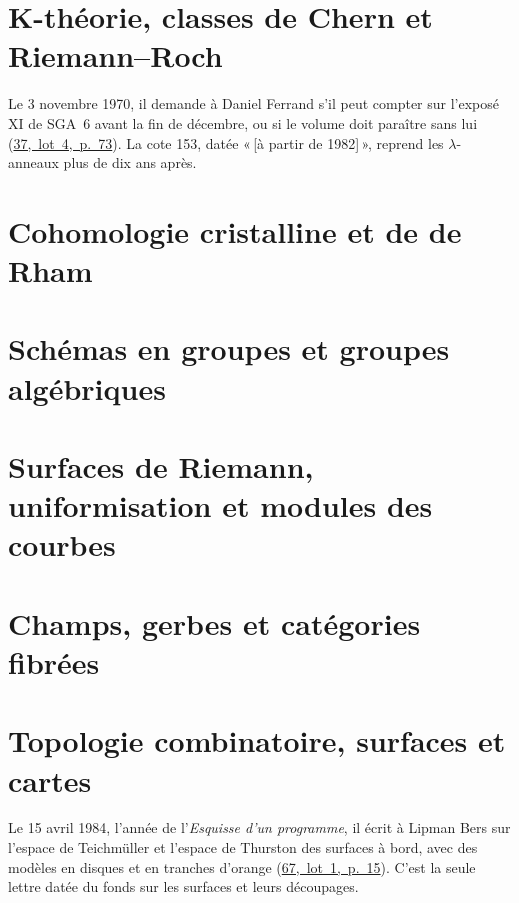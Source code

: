 \documentclass[11pt]{article}
\newcommand{\q}[1]{«\,#1\,»}
\newcommand{\lot}[3]{\mbox{\href{https://grothendieck.commutator.io/\##1/#2/p#3}{#1, lot #2, p.~#3}}}
\newcommand{\lettres}[1]{{\small #1\par}\medskip}
\theoremstyle{plain}
\theoremstyle{definition}
\theoremstyle{plain}
\theoremstyle{definition}
\theoremstyle{remark}
\renewcommand{\_}{\bkunderscore\allowbreak}
\begin{document}
\part{K-théorie, classes de Chern et Riemann--Roch}
\lettres{Le 3 novembre 1970, il demande à Daniel Ferrand s'il peut compter sur l'exposé XI de SGA~6 avant la fin de décembre, ou si le volume doit paraître sans lui (\lot{37}{4}{73}). La cote 153, datée \q{[à partir de 1982]}, reprend les $\lambda$-anneaux plus de dix ans après.}




\part{Cohomologie cristalline et de de Rham}



\part{Schémas en groupes et groupes algébriques}
















\part{Surfaces de Riemann, uniformisation et modules des courbes}



\part{Champs, gerbes et catégories fibrées}



\part{Topologie combinatoire, surfaces et cartes}
\lettres{Le 15 avril 1984, l'année de l'\emph{Esquisse d'un programme}, il écrit à Lipman Bers sur l'espace de Teichmüller et l'espace de Thurston des surfaces à bord, avec des modèles en disques et en tranches d'orange (\lot{67}{1}{15}). C'est la seule lettre datée du fonds sur les surfaces et leurs découpages.}












\end{document}
